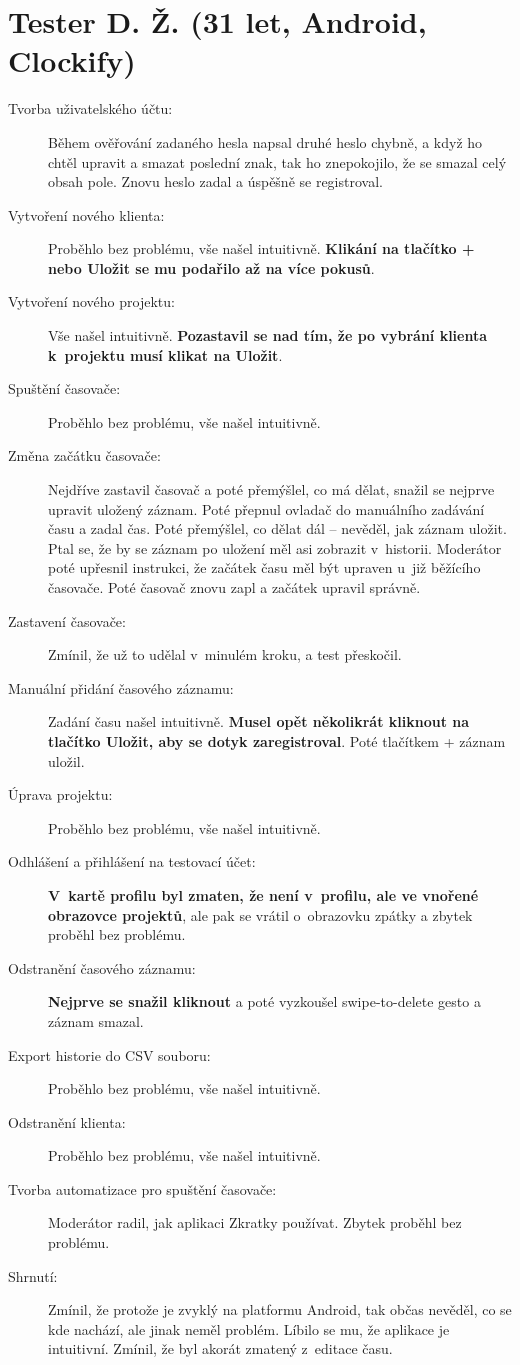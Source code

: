 \section*{Tester D. Ž. (31 let, Android, Clockify)}

\begin{description}
\item[Tvorba uživatelského účtu:] Během ověřování zadaného hesla napsal druhé heslo chybně, a když ho chtěl upravit a smazat poslední znak, tak ho znepokojilo, že se smazal celý obsah pole. Znovu heslo zadal a úspěšně se registroval.
\item[Vytvoření nového klienta:] Proběhlo bez problému, vše našel intuitivně. \textbf{Klikání na tlačítko + nebo Uložit se mu podařilo až na více pokusů}.
\item[Vytvoření nového projektu:] Vše našel intuitivně. \textbf{Pozastavil se nad tím, že po vybrání klienta k~projektu musí klikat na Uložit}.
\item[Spuštění časovače:] Proběhlo bez problému, vše našel intuitivně.
\item[Změna začátku časovače:] Nejdříve zastavil časovač a poté přemýšlel, co má dělat, snažil se nejprve upravit uložený záznam. Poté přepnul ovladač do manuálního zadávání času a zadal čas. Poté přemýšlel, co dělat dál – nevěděl, jak záznam uložit. Ptal se, že by se záznam po uložení měl asi zobrazit v~historii. Moderátor poté upřesnil instrukci, že začátek času měl být upraven u~již běžícího časovače. Poté časovač znovu zapl a začátek upravil správně.
\item[Zastavení časovače:] Zmínil, že už to udělal v~minulém kroku, a test přeskočil.
\item[Manuální přidání časového záznamu:] Zadání času našel intuitivně. \textbf{Musel opět několikrát kliknout na tlačítko Uložit, aby se dotyk zaregistroval}. Poté tlačítkem + záznam uložil.
\item[Úprava projektu:] Proběhlo bez problému, vše našel intuitivně.
\item[Odhlášení a přihlášení na testovací účet:] \textbf{V~kartě profilu byl zmaten, že není v~profilu, ale ve vnořené obrazovce projektů}, ale pak se vrátil o~obrazovku zpátky a zbytek proběhl bez problému.
\item[Odstranění časového záznamu:] \textbf{Nejprve se snažil kliknout} a poté vyzkoušel swipe-to-delete gesto a záznam smazal.
\item[Export historie do CSV souboru:] Proběhlo bez problému, vše našel intuitivně.
\item[Odstranění klienta:] Proběhlo bez problému, vše našel intuitivně.
\item[Tvorba automatizace pro spuštění časovače:] Moderátor radil, jak aplikaci Zkratky používat. Zbytek proběhl bez problému.
\item[Shrnutí:] Zmínil, že protože je zvyklý na platformu Android, tak občas nevěděl, co se kde nachází, ale jinak neměl problém. Líbilo se mu, že aplikace je intuitivní. Zmínil, že byl akorát zmatený z~editace času. 
\end{description}


